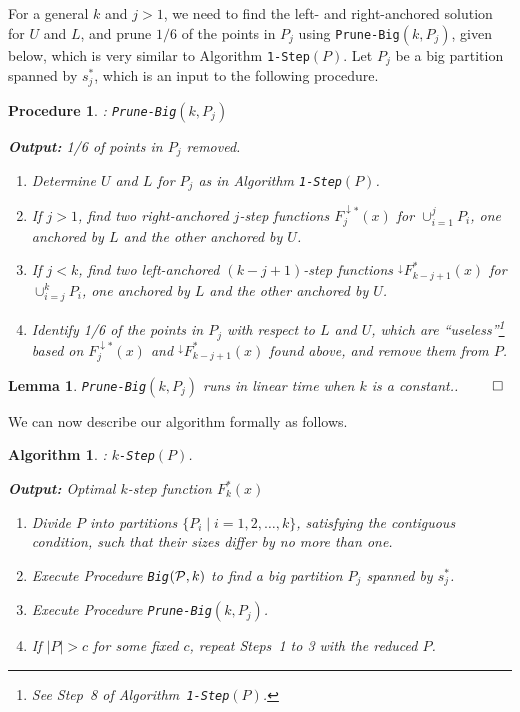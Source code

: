\documentclass[preprint,10pt]{elsarticle}
\newcommand{\QED}{\hfill$\qed$}
\newtheorem{lemma}{Lemma}
\newtheorem{algorithm}{Algorithm}
\newtheorem{procedure}{Procedure}
\begin{document}
For a general $k$ and $j>1$,
we need to find the left- and right-anchored solution for $U$ and $L$,
and prune $1/6$ of the points in $P_j$ using {\tt Prune-Big$(k,P_j)$}, given below,
which is very similar to Algorithm {\tt 1-Step}$(P)$.
Let $P_j$ be a big partition spanned by $s^*_j$,
which is an input to the following procedure.
\begin{procedure}{\rm :} {\tt Prune-Big$(k,P_j)$}

\noindent
{\bf Output:} 1/6 of points in $P_j$ removed.


\begin{enumerate}
\item
Determine $U$ and $L$ for $P_j$ as in Algorithm {\tt 1-Step}$(P)$. 
\item 
If $j>1$, find two right-anchored $j$-step functions $F_j^{\downarrow *}(x)$ for $\cup_{i=1}^{j} P_i$,
one anchored by $L$ and the other anchored by $U$.
\item
If $j< k$, find two left-anchored $(k-j+1)$-step functions
 $^{\downarrow}\!F^*_{k-j+1}(x)$ for $\cup_{i=j}^k P_i$,
one anchored by $L$ and the other anchored by $U$.
\item
Identify 1/6 of the points in $P_j$ with respect to $L$ and $U$,
which are ``useless''\footnote{See Step~8 of Algorithm~{\tt 1-Step}$(P)$.}
based on $F_j^{\downarrow *}\!(x)$
and $^{\downarrow}\!F^*_{k-j+1}(x)$ found above,
and remove them from $P$. 
\end{enumerate}
\end{procedure}



\begin{lemma}\label{lem:anchored}
{\tt Prune-Big$(k,P_j)$} runs in linear time when $k$ is a constant..
\QED
\end{lemma}

We can now describe our algorithm formally as follows.

\begin{algorithm}{\rm :} {\tt $k$-Step}$(P)$. 

\noindent
{\bf Output:}  Optimal $k$-step function $F^*_k(x)$
\begin{enumerate}
\item 
Divide $P$ into partitions $\{P_i \mid i = 1, 2, \ldots, k\}$,
satisfying the contiguous condition,
such that their sizes differ by no more than one.
\item 
Execute Procedure {\tt Big$({\cal P},k)$} to find a big partition $P_j$
spanned by $s^*_j$. 
\item
Execute Procedure {\tt Prune-Big$(k,P_j)$}.
\item
If $|P| > c$ for some fixed $c$, 
repeat Steps~1 to 3 with the reduced $P$.
\end{enumerate}
\end{algorithm}
\end{document}

